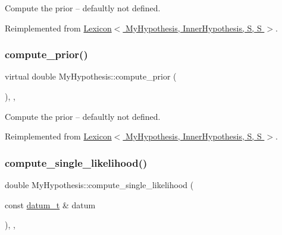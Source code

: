 Compute the prior -- defaultly not defined. 



Reimplemented from \hyperlink{class_lexicon_a2e099a68dd08d62897b40647f92eba1c}{Lexicon$<$ My\+Hypothesis, Inner\+Hypothesis, S, S $>$}.

\mbox{\label{class_my_hypothesis_ab092094c5fc31730de4f40609220bb18}} 
\subsubsection{\texorpdfstring{compute\+\_\+prior()}{compute\_prior()}\hspace{0.1cm}{\footnotesize\ttfamily [2/2]}}
{\footnotesize\ttfamily virtual double My\+Hypothesis\+::compute\+\_\+prior (\begin{DoxyParamCaption}{ }\end{DoxyParamCaption})\hspace{0.3cm}{\ttfamily [inline]}, {\ttfamily [override]}, {\ttfamily [virtual]}}



Compute the prior -- defaultly not defined. 



Reimplemented from \hyperlink{class_lexicon_a2e099a68dd08d62897b40647f92eba1c}{Lexicon$<$ My\+Hypothesis, Inner\+Hypothesis, S, S $>$}.

\mbox{\label{class_my_hypothesis_af23a45a03a28ea4f42438e70d47acacb}} 
\subsubsection{\texorpdfstring{compute\+\_\+single\+\_\+likelihood()}{compute\_single\_likelihood()}\hspace{0.1cm}{\footnotesize\ttfamily [1/5]}}
{\footnotesize\ttfamily double My\+Hypothesis\+::compute\+\_\+single\+\_\+likelihood (\begin{DoxyParamCaption}\item[{const \hyperlink{class_bayesable_a9f1a6c0cd7855550fa10b1a8f13a5867}{datum\+\_\+t} \&}]{datum }\end{DoxyParamCaption})\hspace{0.3cm}{\ttfamily [inline]}, {\ttfamily [override]}, {\ttfamily [virtual]}}




